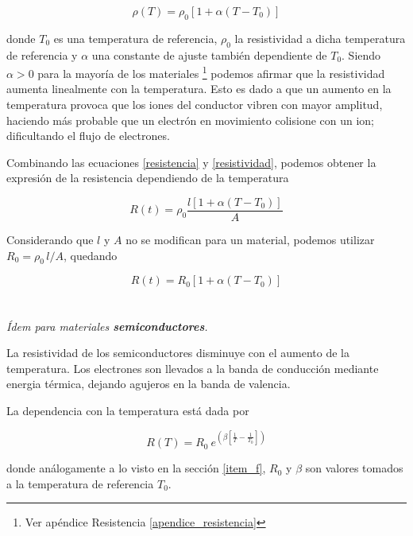 \documentclass[12pt,a4paper]{article}
\begin{document}
		\begin{equation}\label{resistividad}
			\rho(T) = \rho_{0} \left[ 1 + \alpha (T - T_0) \right]
		\end{equation}

		donde $T_0$ es una temperatura de referencia, $\rho_0$ la resistividad a dicha temperatura de referencia y $\alpha$ una constante de ajuste también dependiente de $T_0$. Siendo $\alpha > 0$ para la mayoría de los materiales \footnote{Ver apéndice Resistencia \ref{apendice_resistencia}} podemos afirmar que la resistividad aumenta linealmente con la temperatura. Esto es dado a que un aumento en la temperatura provoca que los iones del conductor vibren con mayor amplitud, haciendo más probable que un electrón en movimiento colisione con un ion; dificultando el flujo de electrones.

		Combinando las ecuaciones \ref{resistencia} y \ref{resistividad}, podemos obtener la expresión de la resistencia dependiendo de la temperatura

		\begin{equation}
			R(t) = \rho_0 \frac{l \left[ 1 + \alpha (T - T_0) \right] }{A}
		\end{equation}
		
		Considerando que $l$ y $A$ no se modifican para un material, podemos utilizar $R_0 = \rho_0 \, l/A$, quedando

		\begin{equation}
			R(t) = R_0 \left[ 1 + \alpha (T - T_0) \right]
		\end{equation}

	\section{}
		\textit{
			Ídem para materiales \textbf{semiconductores}.
		}

		La resistividad de los semiconductores disminuye con el aumento de la temperatura. Los electrones son llevados a la banda de conducción mediante energia térmica, dejando agujeros en la banda de valencia.

		La dependencia con la temperatura está dada por

		\begin{equation}
			R(T) = R_0 \: e^{\left(\displaystyle \beta \left[\frac{1}{T} - \frac{1}{T_0} \right] \right)}
		\end{equation}

		donde análogamente a lo visto en la sección \ref{item_f}, $R_0$ y $\beta$ son valores tomados a la temperatura de referencia $T_0$.
\end{document}
